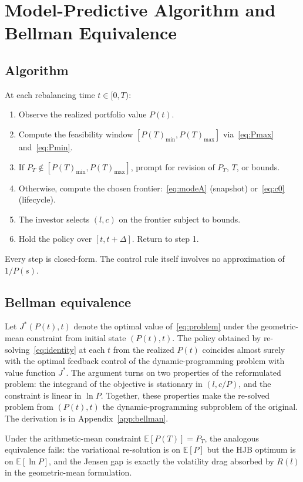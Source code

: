 \documentclass[11pt]{article}
\begin{document}
\section{Model-Predictive Algorithm and Bellman Equivalence}
\label{sec:mpc}

\subsection{Algorithm}

At each rebalancing time $t \in [0, T)$:

\begin{enumerate}
  \item Observe the realized portfolio value $P(t)$.
  \item Compute the feasibility window $[P(T)_{\min}, P(T)_{\max}]$ via~\eqref{eq:Pmax} and~\eqref{eq:Pmin}.
  \item If $P_T \notin [P(T)_{\min}, P(T)_{\max}]$, prompt for
    revision of $P_T$, $T$, or bounds.
  \item Otherwise, compute the chosen frontier:~\eqref{eq:modeA}
    (snapshot) or~\eqref{eq:c0} (lifecycle).
  \item The investor selects $(l, c)$ on the frontier subject to
    bounds.
  \item Hold the policy over $[t, t + \Delta]$. Return to step 1.
\end{enumerate}

Every step is closed-form. The control rule itself involves no
approximation of $1/P(s)$.

\subsection{Bellman equivalence}

Let $J^*(P(t), t)$ denote the optimal value of~\eqref{eq:problem}
under the geometric-mean constraint from initial state $(P(t), t)$.
The policy obtained by re-solving~\eqref{eq:identity} at each $t$ from
the realized $P(t)$ coincides almost surely with the optimal feedback
control of the dynamic-programming problem with value function $J^*$.
The argument turns on two properties of the reformulated problem:
the integrand of the objective is stationary in $(l, c/P)$, and the
constraint is linear in $\ln P$. Together, these properties make the
re-solved problem from $(P(t), t)$ the dynamic-programming subproblem
of the original. The derivation is in Appendix~\ref{app:bellman}.

Under the arithmetic-mean constraint $\mathbb{E}[P(T)] = P_T$, the
analogous equivalence fails: the variational re-solution is on
$\mathbb{E}[P]$ but the HJB optimum is on $\mathbb{E}[\ln P]$, and
the Jensen gap is exactly the volatility drag absorbed by $R(l)$ in
the geometric-mean formulation.
\end{document}
